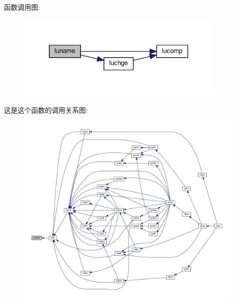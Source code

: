 函数调用图\+:
\nopagebreak
\begin{figure}[H]
\begin{center}
\leavevmode
\includegraphics[width=293pt]{luname_8f90_ad024c8c10ed2b39e9271e84f0cd51326_cgraph}
\end{center}
\end{figure}
这是这个函数的调用关系图\+:
\nopagebreak
\begin{figure}[H]
\begin{center}
\leavevmode
\includegraphics[width=350pt]{luname_8f90_ad024c8c10ed2b39e9271e84f0cd51326_icgraph}
\end{center}
\end{figure}
